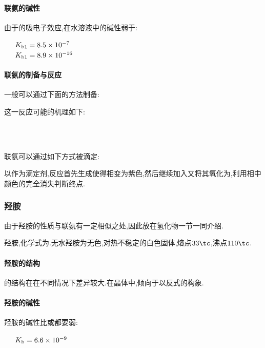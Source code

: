 \documentclass{ctexart}
\begin{document}
\paragraph{联氨的碱性}
由于的吸电子效应,在水溶液中的碱性弱于:
\begin{center}
    \ \ \ $K_{\text b1}=8.5\times10^{-7}$\\
    \ \ \ $K_{\text b1}=8.9\times10^{-16}$
\end{center}
\paragraph{联氨的制备与反应}
一般可以通过下面的方法制备:
\begin{center}
\end{center}
这一反应可能的机理如下:
\begin{center}
    \\
    \\
\end{center}
联氨可以通过如下方式被滴定:
\begin{center}
\end{center}
以作为滴定剂,反应首先生成使得相变为紫色,然后继续加入又将其氧化为,利用相中颜色的完全消失判断终点.
\subsubsection{羟胺}
由于羟胺的性质与联氨有一定相似之处,因此放在氢化物一节一同介绍.
\begin{substance}[\ce{NH2OH}]
    羟胺,化学式为.无水羟胺为无色,对热不稳定的白色固体,熔点$33\tc$,沸点$110\tc$.
\end{substance}
\paragraph{羟胺的结构}
的结构在在不同情况下差异较大.在晶体中,倾向于以反式的构象.
\paragraph{羟胺的碱性}
羟胺的碱性比或都要弱:
\begin{center}
    \ \ \ $K_\text b=6.6\times10^{-9}$
\end{center}
\end{document}
